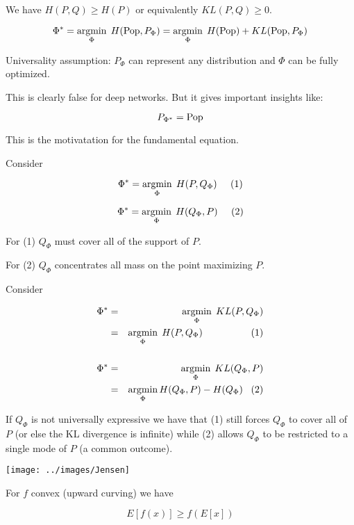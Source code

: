 {\vfill
We have {\color{red} $H(P,Q) \geq H(P)$} or equivalently {\color{red} $KL(P,Q) \geq 0$}.


{\color{red} $$\Phi^* = \operatorname*{argmin}_\Phi\;H(\mathrm{Pop},P_\Phi) = \operatorname*{argmin}_\Phi\;H(\mathrm{Pop}) + KL(\mathrm{Pop},P_\Phi)$$}

\vfill
Universality assumption: {\color{red} $P_\Phi$ can represent any distribution and $\Phi$ can be fully optimized.}

\vfill
This is clearly false for deep networks.  {\color{red} But it gives important insights like:}

{\color{red} $$P_{\Phi^*} = \mathrm{Pop}$$}

\vfill
{\color{red} \centerline{This is the motivatation for the fundamental equation.}}


Consider 


$$\Phi^* = \operatorname*{argmin}_\Phi \;H(P,Q_\Phi)\;\;\;\;\;(1)$$

\vfill
$$\Phi^* = \operatorname*{argmin}_\Phi \;H(Q_\Phi,P)\;\;\;\;\;(2)$$

\vfill
For (1) $Q_\Phi$ must cover all of the support of $P$.

\vfill
For (2) $Q_\Phi$ concentrates all mass on the point maximizing $P$.

    
Consider 


\begin{eqnarray*}
  \Phi^* & = & \operatorname*{argmin}_\Phi \;KL(P,Q_\Phi) \\
  & = & \operatorname*{argmin}_\Phi\; H(P,Q_\Phi)\;\;\;\;\;\;\;\;\;\;\;\;\;\;\;\;\;\;(1) \\
  \\
  \Phi^* & = & \operatorname*{argmin}_\Phi \;KL(Q_\Phi,P) \\
  & = & \operatorname*{argmin}_\Phi H(Q_\Phi,P) - H(Q_\Phi)\;\;\;(2)
  \end{eqnarray*}

\vfill
If $Q_\Phi$ is not universally expressive we have that (1) still forces $Q_\Phi$ to cover all of $P$ (or else the KL divergence is infinite)
while (2) allows $Q_\Phi$ to be restricted to a single mode of $P$ (a common outcome).


\centerline{\texttt{[image: ../images/Jensen]}}

\vfill
For $f$ convex (upward curving) we have

\vfill
$$E[f(x)] \geq f(E[x])$$

}
